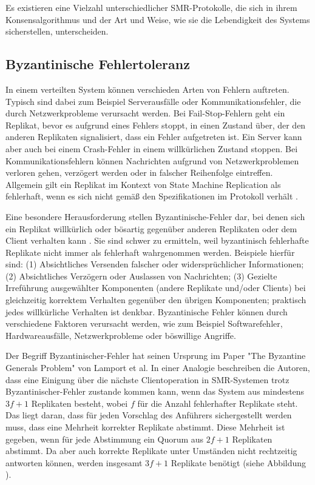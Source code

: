 \documentclass[nonacm,sigconf,natbib=false]{acmart}
\begin{document}
Es existieren eine Vielzahl unterschiedlicher SMR-Protokolle, die sich in ihrem Konsensalgorithmus und der Art und Weise, wie sie die Lebendigkeit des Systems sicherstellen, unterscheiden.

\subsection{Byzantinische Fehlertoleranz}

In einem verteilten System können verschieden Arten von Fehlern auftreten. Typisch sind dabei zum Beispiel Serverausfälle oder Kommunikationsfehler, die durch Netzwerkprobleme verursacht werden. Bei Fail-Stop-Fehlern geht ein Replikat, bevor es aufgrund eines Fehlers stoppt, in einen Zustand über, der den anderen Replikaten signalisiert, dass ein Fehler aufgetreten ist. Ein Server kann aber auch bei einem Crash-Fehler in einem willkürlichen Zustand stoppen. Bei Kommunikationsfehlern können Nachrichten aufgrund von Netzwerkproblemen verloren gehen, verzögert werden oder in falscher Reihenfolge eintreffen. Allgemein gilt ein Replikat im Kontext von State Machine Replication als fehlerhaft, wenn es sich nicht gemäß den Spezifikationen im Protokoll verhält \cite{smr-schneider}.

Eine besondere Herausforderung stellen Byzantinische-Fehler dar, bei denen sich ein Replikat willkürlich oder bösartig gegenüber anderen Replikaten oder dem Client verhalten kann \cite{smr-schneider}. Sie sind schwer zu ermitteln, weil byzantinisch fehlerhafte Replikate nicht immer als fehlerhaft wahrgenommen werden. Beispiele hierfür sind: (1) Absichtliches Versenden falscher oder widersprüchlicher Informationen; (2) Absichtliches Verzögern oder Auslassen von Nachrichten; (3) Gezielte Irreführung ausgewählter Komponenten (andere Replikate und/oder Clients) bei gleichzeitig korrektem Verhalten gegenüber den übrigen Komponenten; praktisch jedes willkürliche Verhalten ist denkbar. Byzantinische Fehler können durch verschiedene Faktoren verursacht werden, wie zum Beispiel Softwarefehler, Hardwareausfälle, Netzwerkprobleme oder böswillige Angriffe.

Der Begriff Byzantinischer-Fehler hat seinen Ursprung im Paper "The Byzantine Generals Problem"\cite{byzantine-generals-problem} von Lamport et al. In einer Analogie beschreiben die Autoren, dass eine Einigung über die nächste Clientoperation in SMR-Systemen trotz Byzantinischer-Fehler zustande kommen kann, wenn das System aus mindestens $3f+1$ Replikaten besteht, wobei $f$ für die Anzahl fehlerhafter Replikate steht. Das liegt daran, dass für jeden Vorschlag des Anführers sichergestellt werden muss, dass eine Mehrheit korrekter Replikate abstimmt. Diese Mehrheit ist gegeben, wenn für jede Abstimmung ein Quorum aus $2f+1$ Replikaten abstimmt. Da aber auch korrekte Replikate unter Umständen nicht rechtzeitig antworten können, werden insgesamt $3f+1$ Replikate benötigt (siehe Abbildung ).
\end{document}
